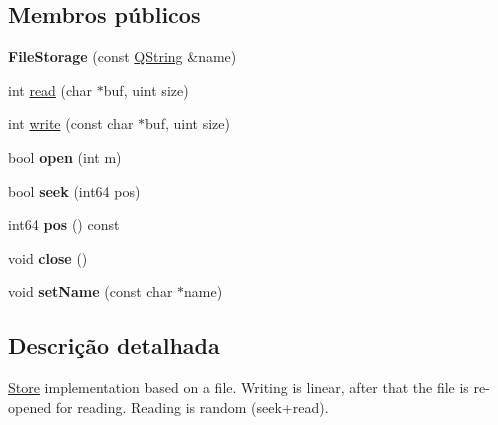 \subsection*{Membros públicos}
\begin{DoxyCompactItemize}
\item 
\hypertarget{class_file_storage_aeeb2d55a90d83620b798e85e1550c288}{{\bfseries File\-Storage} (const \hyperlink{class_q_string}{Q\-String} \&name)}\label{class_file_storage_aeeb2d55a90d83620b798e85e1550c288}

\item 
int \hyperlink{class_file_storage_a8e47d0de1e7f98cc7af54d4f44e09186}{read} (char $\ast$buf, uint size)
\item 
int \hyperlink{class_file_storage_a92a061380ba3dac165ee1a5e92617a6a}{write} (const char $\ast$buf, uint size)
\item 
\hypertarget{class_file_storage_a2c4ec4ed8d34c778b4e7c7b4db3de4b2}{bool {\bfseries open} (int m)}\label{class_file_storage_a2c4ec4ed8d34c778b4e7c7b4db3de4b2}

\item 
\hypertarget{class_file_storage_a0d12eec06745bfbf5249f984717fab38}{bool {\bfseries seek} (int64 pos)}\label{class_file_storage_a0d12eec06745bfbf5249f984717fab38}

\item 
\hypertarget{class_file_storage_af9f2e0fc2971f8c517ce322c5bce4805}{int64 {\bfseries pos} () const }\label{class_file_storage_af9f2e0fc2971f8c517ce322c5bce4805}

\item 
\hypertarget{class_file_storage_a5ae591df94fc66ccb85cbb6565368bca}{void {\bfseries close} ()}\label{class_file_storage_a5ae591df94fc66ccb85cbb6565368bca}

\item 
\hypertarget{class_file_storage_ab3a256e7d9fad73fa57de7c1fedf51c5}{void {\bfseries set\-Name} (const char $\ast$name)}\label{class_file_storage_ab3a256e7d9fad73fa57de7c1fedf51c5}

\end{DoxyCompactItemize}


\subsection{Descrição detalhada}
\hyperlink{class_store}{Store} implementation based on a file. Writing is linear, after that the file is re-\/opened for reading. Reading is random (seek+read). 

